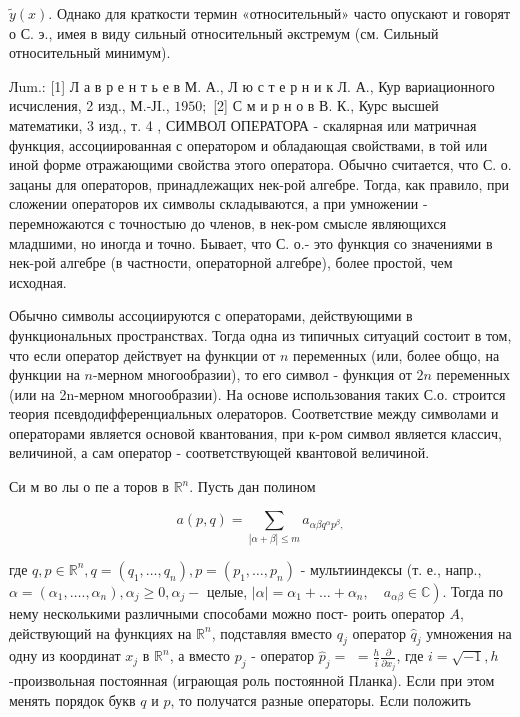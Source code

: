 \documentclass[10pt]{article}
\begin{document}
$\tilde{y}(x)$. Однако для краткости термин «относительный» часто опускают и говорят о С. э., имея в виду сильный относительный әкстремум (см. Сильный относительный минимум).



Лum.: [1] Л а в р е н т ь е в М. А., Л ю с т е р н и к Л. А., Кур вариационного исчисления, 2 изд., М.-ЈI., $1950 ;$ [2] С м и р н о в В. К., Курс высшей математики, 3 изд., т. 4 , СИМВОЛ ОПЕРАТОРА - скалярная или матричная функция, ассоциированная с оператором и обладающая свойствами, в той или иной форме отражающими свойства этого оператора. Обычно считается, что С. о. зацаны для операторов, принадлежащих нек-рой алгебре. Тогда, как правило, при сложении операторов их символы складываются, а при умножении - перемножаются с точностыю до членов, в нек-ром смысле являющихся младшими, но иногда и точно. Бывает, что С. о.- это функция со значениями в нек-рой алгебре (в частности, операторной алгебре), более простой, чем исходная.



Обычно символы ассоциируются с операторами, действующими в функциональных пространствах. Тогда одна из типичных ситуаций состоит в том, что если оператор действует на функции от $n$ переменных (или, более общо, на функции на $n$-мерном многообразии), то его символ - функция от $2 n$ переменных (или на 2n-мерном многообразии). На основе использования таких С.о. строится теория псевдодифференциальных олераторов. Соответствие между символами и операторами является основой квантования, при к-ром символ является классич, величиной, а сам оператор - соответствующей квантовой величиной.



Си м во лы о пе а торов в $\mathbb{R}^{n}$. Пусть дан полином



\[

a(p, q)=\sum_{|\alpha+\beta| \leqslant m} a_{\alpha \beta q^{\alpha} p^{\beta},}

\]



где $q, p \in \mathbb{R}^{n}, q=\left(q_{1}, \ldots, q_{n}\right), p=\left(p_{1}, \ldots, p_{n}\right)$ - мультииндексы (т. е., напр., $\alpha=\left(\alpha_{1}, \ldots ., \alpha_{n}\right), \alpha_{j} \geqslant 0, \alpha_{j}-$ целые, $\left.|\alpha|=\alpha_{1}+\ldots+\alpha_{n}, \quad a_{\alpha \beta} \in \mathbb{C}\right)$. Тогда по нему несколькими различными способами можно пост- роить оператор $A$, действующий на функциях на $\mathbb{R}^{n}$, подставляя вместо $q_{j}$ оператор $\hat{q}_{j}$ умножения на одну из координат $x_{j}$ в $\mathbb{R}^{n}$, а вместо $p_{j}$ - оператор $\hat{p}_{j}=$ $=\frac{h}{i} \frac{\partial}{\partial x_{j}}$, где $i=\sqrt{-1}, h$-произвольная постоянная (играющая роль постоянной Планка). Если при этом менять порядок букв $q$ и $p$, то получатся разные операторы. Если положить
\end{document}
